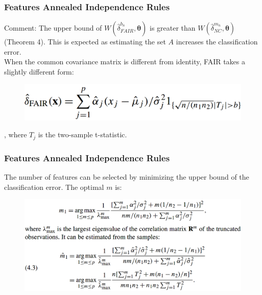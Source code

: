\documentclass{beamer}
\begin{document}
	\begin{frame}
		\frametitle{Features Annealed Independence Rules}
		Comment: The upper bound of $W(\hat{\delta}^{b_n}_{FAIR}, \bm{\theta})$ is greater than $W(\hat{\delta}^{m_n}_{NC}, \bm{\theta})$ (Theorem 4). This is expected as estimating the set $A$ increases the classification error.\\
		\vspace{\baselineskip}
		When the common covariance matrix is different from identity, FAIR takes a slightly different form:
		\begin{figure}
			\includegraphics[width=.7\linewidth]{image011.png}
		\end{figure}
		, where $T_j$ is the two-sample t-statistic. 
	\end{frame}
	
	\begin{frame}
		\frametitle{Features Annealed Independence Rules}
		The number of features can be selected by minimizing the upper bound of the classification error. The optimal $m$ is:
		\begin{figure}
			\includegraphics[width=.9\linewidth]{image012.png}
		\end{figure}
	\end{frame}
	
\end{document}
